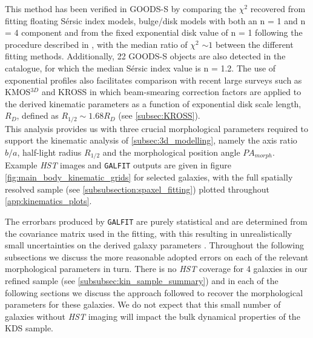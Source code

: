 \documentclass[fleqn,usenatbib]{mn2e}
\newcommand{\Sers}{S\'{e}rsic }
\begin{document}
This method has been verified in GOODS-S by comparing the $\chi ^{2}$ recovered from fitting floating \Sers index models, bulge/disk models with both an n = 1 and n = 4 component and from the fixed exponential disk value of n = 1 following the procedure described in \cite{Bruce2012}, with the median ratio of $\chi ^{2}$ $\sim 1$ between the different fitting methods. Additionally, 22 GOODS-S objects are also detected in the \cite{VanderWel2012} catalogue, for which the median \Sers index value is n = 1.2.
The use of exponential profiles also facilitates comparison with recent large surveys such as KMOS$^{3D}$ \citep{Wisnioski2015} and KROSS \citep{Harrison2017} in which beam-smearing correction factors are applied to the derived kinematic parameters as a function of exponential disk scale length, $R_{D}$, defined as $R_{1/2} \sim 1.68 R_{D}$ (see \cref{subsec:KROSS}). \\

This analysis provides us with three crucial morphological parameters required to support the kinematic analysis of \cref{subsec:3d_modelling}, namely the axis ratio $b/a$, half-light radius $R_{1/2}$ and the morphological position angle $PA_{morph}$.
Example {\em HST} images and {\tt GALFIT} outputs are given in figure \ref{fig:main_body_kinematic_grids} for selected galaxies, with the full spatially resolved sample (see \cref{subsubsection:spaxel_fitting}) plotted throughout \cref{app:kinematics_plots}. 

The errorbars produced by {\tt GALFIT} are purely statistical and are determined from the covariance matrix used in the fitting, with this resulting in unrealistically small uncertainties on the derived galaxy parameters \citep{Hausler2007,Bruce2012}.
Throughout the following subsections we discuss the more reasonable adopted errors on each of the relevant morphological parameters in turn.
There is no {\em HST} coverage for 4 galaxies in our refined sample (see \cref{subsubsec:kin_sample_summary}) and in each of the following sections we discuss the approach followed to recover the morphological parameters for these galaxies.
We do not expect that this small number of galaxies without {\em HST} imaging will impact the bulk dynamical properties of the KDS sample.
\end{document}
